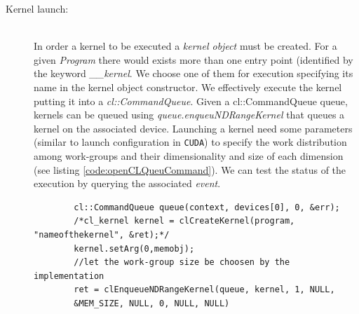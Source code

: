\begin{description}
\begin{description}
    	
    	\item [Kernel launch:]\hfil \\
    	In order a kernel to be executed a \emph{kernel object} must be created.
    	For a given \emph{Program} there would exists more than one entry point
    	(identified by the keyword \emph{\_\_kernel}. We choose one of them for
    	execution specifying its name in the kernel object constructor.    	
    	 We effectively execute the kernel putting it into a 
    	\emph{cl::CommandQueue}. Given a cl::CommandQueue queue, kernels can be queued
    	using \textit{queue.enqueu\-NDRangeKernel} that queues a kernel on
    	the associated device.
    	Launching a kernel need some parameters (similar to launch configuration in
    	\texttt{CUDA}) to specify the work distribution among
    	work-groups and their dimensionality and size of each dimension (see listing
    	\ref{code:openCLQueuCommand}). We can test the status of the execution by
    	querying the associated \emph{event}.
    	\begin{lstlisting}
    	cl::CommandQueue queue(context, devices[0], 0, &err);
	    /*cl_kernel kernel = clCreateKernel(program, "nameofthekernel", &ret);*/
	    kernel.setArg(0,memobj);
	    //let the work-group size be choosen by the implementation 
	    ret = clEnqueueNDRangeKernel(queue, kernel, 1, NULL,
	    &MEM_SIZE, NULL, 0, NULL, NULL)
    	\end{lstlisting}
    \end{description}
\end{description}
 
